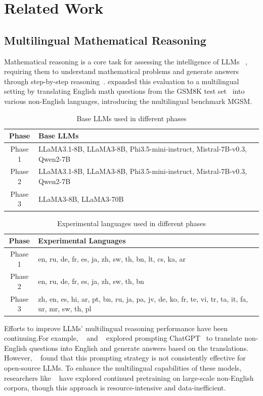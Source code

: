 \documentclass[11pt]{article}
\begin{document}
\section{Related Work}

\subsection{Multilingual Mathematical Reasoning}
Mathematical reasoning is a core task for assessing the intelligence of LLMs ~\citep{zhang2024mathverse,zhang2024mario}, requiring them to understand mathematical problems and generate answers through step-by-step reasoning~\citep{ahn2024largelanguagemodelsmathematical,zhang2022automatic,liu2023federated}. \citep{shi2022language} expanded this evaluation to a multilingual setting by translating English math questions from the GSM8K test set~\citep{cobbe2021trainingverifierssolvemath} into various non-English languages, introducing the multilingual benchmark MGSM.


\begin{table}[h]
\centering
\caption{Base LLMs used in different phases}
\begin{tabular}{|c|l|}
\hline
\textbf{Phase} & \textbf{Base LLMs} \\ \hline
Phase 1 & LLaMA3.1-8B, LLaMA3-8B, Phi3.5-mini-instruct, Mistral-7B-v0.3, Qwen2-7B \\ \hline
Phase 2 & LLaMA3.1-8B, LLaMA3-8B, Phi3.5-mini-instruct, Mistral-7B-v0.3, Qwen2-7B \\ \hline
Phase 3 & LLaMA3-8B, LLaMA3-70B \\ \hline
\end{tabular}
\end{table}
\begin{table}[h]
\centering
\caption{Experimental languages used in different phases}
\begin{tabular}{|c|l|}
\hline
\textbf{Phase} & \textbf{Experimental Languages} \\ \hline
Phase 1 & en, ru, de, fr, es, ja, zh, sw, th, bn, lt, cs, ka, ar \\ \hline
Phase 2 & en, ru, de, fr, es, ja, zh, sw, th, bn \\ \hline
Phase 3 & zh, en, es, hi, ar, pt, bn, ru, ja, pa, jv, de, ko, fr, te, vi, tr, ta, it, fa, ur, mr, sw, th, pl \\ \hline
\end{tabular}
\end{table}


Efforts to improve LLMs' multilingual reasoning performance have been continuing.For example, ~\citep{huang2023languagescreatedequalllms} and ~\citep{qin-etal-2023-cross} explored prompting ChatGPT~\citep{openai2023gpt4} to translate non-English questions into English and generate answers based on the translations. However, ~\citep{hu2024largelanguagemodelscrosslingual} found that this prompting strategy is not consistently effective for open-source LLMs. To enhance the multilingual capabilities of these models, researchers like ~\citep{nguyen2024seallmslargelanguage} have explored continued pretraining on large-scale non-English corpora, though this approach is resource-intensive and data-inefficient.
\end{document}
